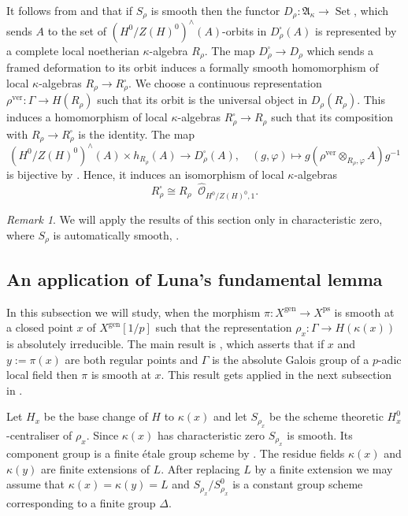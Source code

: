 \documentclass{amsart}
\theoremstyle{definition}
\theoremstyle{remark}
\newtheorem{remar}[prop]{Remark}
\DeclareMathOperator{\Set}{Set}
\newcommand{\OO}{\mathcal O}
\DeclareMathOperator{\wtimes}{\widehat{\otimes}}
\newcommand{\gen}{\mathrm{gen}}
\newcommand{\ps}{\mathrm{ps}}
\newcommand{\Ohat}{\widehat{\OO}}
\newcommand{\ver}{\mathrm{ver}}
\begin{document}
It follows from  and \cite[Proposition 2.5]{KW2} that if $S_{\rho}$ is smooth then the functor $D_{\rho}: \mathfrak A_{\kappa}\rightarrow \Set$, which 
sends $A$ to the set of $(H^0/Z(H)^0)^{\wedge}(A)$-orbits in $D^{\square}_{\rho}(A)$ is represented by a complete local noetherian 
$\kappa$-algebra $R_{\rho}$. The map $D^{\square}_{\rho}\rightarrow D_{\rho}$
which sends a framed deformation to its orbit induces a formally smooth 
homomorphism of local $\kappa$-algebras $R_{\rho}\rightarrow R_{\rho}^{\square}$. We choose a continuous representation $\rho^{\ver}: \Gamma\rightarrow H(R_{\rho})$ such that its orbit is the universal object 
in $D_{\rho}(R_{\rho})$. This induces a 
homomorphism of local $\kappa$-algebras
$R^{\square}_{\rho}\rightarrow R_{\rho}$ such that its composition with $R_{\rho}\rightarrow R^{\square}_{\rho}$ is the identity. The map 
\begin{equation}
 (H^0/Z(H)^0)^{\wedge}(A)\times h_{R_{\rho}}(A) \rightarrow D^{\square}_{\rho}(A), \quad (g,\varphi)
\mapsto  g (\rho^{\ver}\otimes_{R_{\rho}, \varphi} A ) g^{-1}
\end{equation} 
is bijective by \cite[Proposition 2.5]{KW2}. Hence, it induces an isomorphism of local $\kappa$-algebras 
\begin{equation}\label{Ohat}
R^{\square}_{\rho} \cong R_{\rho}\wtimes \Ohat_{H^0/Z(H)^0, 1}.
\end{equation}
\begin{remar} We will apply the results 
of this section only in characteristic zero, where $S_{\rho}$ is automatically smooth, \cite[Theorem 3.23]{milne_alg}. 
\end{remar}


\subsection{An application of Luna's fundamental lemma}\label{sec_luna}
In this subsection we will study, when the morphism $\pi: X^{\gen} \rightarrow X^{\ps}$ is smooth 
at a closed point $x$ of $X^{\gen}[1/p]$  such that the representation $\rho_x: \Gamma\rightarrow H(\kappa(x))$ is absolutely irreducible.
 The main result is , which asserts that 
if $x$ and  $y:=\pi(x)$ are both regular points 
and $\Gamma$ is the absolute Galois group of 
a $p$-adic local field then $\pi$ is smooth at $x$. This result gets
applied in the next subsection in .

Let $H_x$ be the base change of $H$ to 
$\kappa(x)$ and let $S_{\rho_x}$ be the scheme theoretic 
$H^0_x$-centraliser of $\rho_x$. Since $\kappa(x)$ has characteristic zero $S_{\rho_x}$ is smooth. Its 
 component group is a finite \'etale group scheme
by \cite[Proposition 2.37]{milne_alg}. The residue fields $\kappa(x)$ and $\kappa(y)$ are finite extensions of $L$. After replacing $L$ by a finite extension 
we may assume that $\kappa(x)=\kappa(y)=L$ and $S_{\rho_x}/S^0_{\rho_x}$ is a constant group
scheme corresponding to a finite group $\Delta$. 
\end{document}
